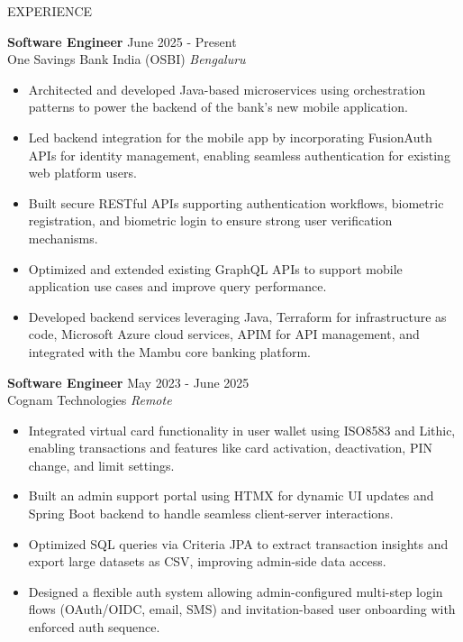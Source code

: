 \documentclass{resume}
\begin{document}
\begin{rSection}{EXPERIENCE}

\textbf{Software Engineer} \hfill June 2025 - Present\\
One Savings Bank India (OSBI) \hfill \textit{Bengaluru}
\begin{itemize}
    \itemsep-0.5em
    \item Architected and developed Java-based microservices using orchestration patterns to power the backend of the bank's new mobile application.

    \item Led backend integration for the mobile app by incorporating FusionAuth APIs for identity management, enabling seamless authentication for existing web platform users.

    \item Built secure RESTful APIs supporting authentication workflows, biometric registration, and biometric login to ensure strong user verification mechanisms.

    \item Optimized and extended existing GraphQL APIs to support mobile application use cases and improve query performance.

    \item Developed backend services leveraging Java, Terraform for infrastructure as code, Microsoft Azure cloud services, APIM for API management, and integrated with the Mambu core banking platform.
\end{itemize}

\textbf{Software Engineer} \hfill May 2023 - June 2025\\
Cognam Technologies \hfill \textit{Remote}
\begin{itemize}
    \itemsep-0.5em
    \item Integrated virtual card functionality in user wallet using ISO8583 and Lithic, enabling transactions and features like card activation, deactivation, PIN change, and limit settings.

    \item Built an admin support portal using HTMX for dynamic UI updates and Spring Boot backend to handle seamless client-server interactions.

    \item Optimized SQL queries via Criteria JPA to extract transaction insights and export large datasets as CSV, improving admin-side data access.

    \item Designed a flexible auth system allowing admin-configured multi-step login flows (OAuth/OIDC, email, SMS) and invitation-based user onboarding with enforced auth sequence.


\end{itemize}
\end{rSection}
\end{document}
